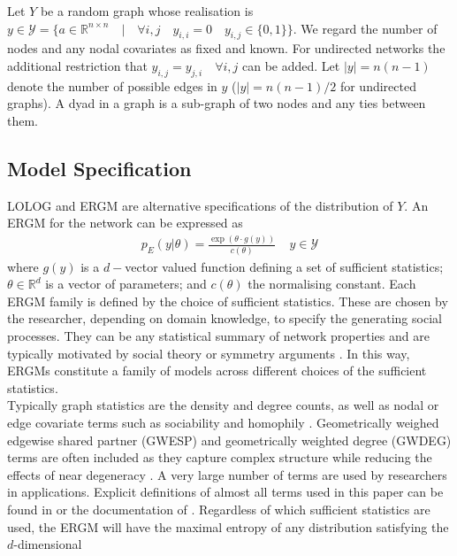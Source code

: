 \documentclass[
]{statsoc}
\begin{document}
Let \(Y\) be a random graph whose realisation is
\(y \in \mathscr{Y} = \lbrace a \in \mathbb{R}^{n \times n} \quad \vert \quad \forall i,j \quad y_{i,i} = 0 \quad y_{i,j} \in \lbrace 0,1 \rbrace\rbrace\).
We regard the number of nodes and any nodal covariates as fixed and
known. For undirected networks the additional restriction that
\(y_{i,j} = y_{j,i} \quad\forall i,j\) can be added. Let \(|y|=n(n-1)\)
denote the number of possible edges in \(y\) (\(|y|=n(n-1)/2\) for
undirected graphs). A dyad in a graph is a sub-graph of two nodes and
any ties between them.

\subsection{Model Specification}

LOLOG and ERGM are alternative specifications of the distribution of
\(Y\). An ERGM for the network can be expressed as
\begin{align}\label{eq:ERGM_spec}
p_{E}(y\vert \theta) = \frac{\exp(\theta\cdot g(y))}{c({\theta})}~~~~~ y\in \mathscr{Y}
\end{align} \noindent where \(g(y)\) is a \(d-\)vector valued function
defining a set of sufficient statistics; \(\theta \in \mathds{R}^{d}\)
is a vector of parameters; and \(c(\theta)\) the normalising constant.
Each ERGM family is defined by the choice of sufficient statistics.
These are chosen by the researcher, depending on domain knowledge, to
specify the generating social processes. They can be any statistical
summary of network properties and are typically motivated by social
theory \citep{goodkittsmorris09} or symmetry arguments \citep{str86}. In
this way, ERGMs constitute a family of models across different choices
of the sufficient statistics.\\
Typically graph statistics are the density and degree counts, as well as
nodal or edge covariate terms such as sociability and homophily
\citep{ergmtermsjss}. Geometrically weighed edgewise shared partner
(GWESP) and geometrically weighted degree (GWDEG) terms are often
included \citep{snijders2006} as they capture complex structure while
reducing the effects of near degeneracy \citep{Handcock2003}. A very
large number of terms are used by researchers in applications. Explicit
definitions of almost all terms used in this paper can be found in
\cite{ergmtermsjss} or the documentation of \cite{ergm_3_9_4}.
Regardless of which sufficient statistics are used, the ERGM will have
the maximal entropy of any distribution satisfying the \(d\)-dimensional
\end{document}
